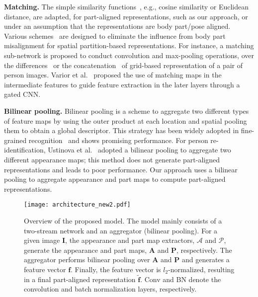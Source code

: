 \documentclass{llncs}
\begin{document}
\vspace{0.1cm}
\noindent\textbf{Matching.}
The simple similarity functions~\cite{deepmetric2014,VariorSLXW16,ChengGZWZ16}, e.g., cosine similarity or Euclidean distance,
are adapted, for part-aligned representations, such as our approach, or under an assumption that the representations are body part/pose aligned. Various schemes~\cite{WangZLZZ16,improved2015,deepreid2014,DCSL2016ijcai} are designed to eliminate the influence
from body part misalignment for spatial partition-based representations. For instance, a matching sub-network is proposed to conduct convolution and max-pooling operations, over the differences~\cite{improved2015} or the concatenation~\cite{deepreid2014,DCSL2016ijcai} of grid-based representation of a pair of person images. Varior et al.~\cite{VariorHW16} proposed the use of matching maps in the intermediate features to guide feature extraction in the later layers through a gated CNN. 

\vspace{0.1cm}
\noindent\textbf{Bilinear pooling.}
Bilinear pooling is a scheme to aggregate two different types of feature maps by using the outer product at each location and spatial pooling them to obtain a global descriptor. This strategy has been widely adopted in fine-grained recognition~\cite{conf/iccv/lin15,conf/cvpr/gao16,conf/iclr/kim17} and shows promising performance. For person re-identification, Ustinova et al.~\cite{conf/avss/ustinova17} adopted a bilinear pooling to aggregate two different appearance maps; this method does not generate part-aligned representations and leads to poor performance. 
Our approach uses a bilinear pooling to aggregate appearance and part maps to compute part-aligned representations.

\begin{figure*}[t]
  \begin{minipage}{0.29\linewidth}
   \end{minipage}
  \begin{minipage}{0.89\linewidth}
   \centering
		\texttt{[image: architecture\_new2.pdf]}
\end{minipage}
\vspace{-0.1cm}
\caption{Overview of the proposed model. The model mainly consists of a two-stream network and an aggregator (bilinear pooling). For a given image $\mathbf{I}$, the appearance and part map extractors, $\mathcal{A}$ and $\mathcal{P}$, generate the appearance and part maps, $\mathbf{A}$ and $\mathbf{P}$, respectively. The aggregator performs bilinear pooling over $\mathbf{A}$ and $\mathbf{P}$ and generates a feature vector $\mathbf{f}$. Finally, the feature vector is $l_2$-normalized, resulting in a final part-aligned representation $\mathbf{\tilde{f}}$. {\color{black}Conv and BN denote the convolution and batch normalization layers, respectively.}}\label{fig:pipeline}
\end{figure*}
\end{document}
